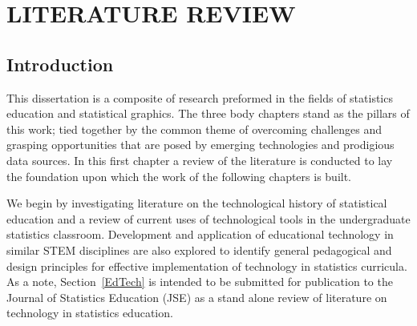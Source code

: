 \documentclass[11pt]{isuthesis}
\begin{document}

% 
\tableofcontents
{} \cleardoublepage {}
{}
\listoftables
\cleardoublepage {} {}
\listoffigures
\cleardoublepage {}

\cleardoublepage {}

% 
\newpage
{}


\chapter{LITERATURE REVIEW}\label{litreview}

\section{Introduction}

This dissertation is a composite of research preformed in the fields of statistics education and statistical graphics. The three body chapters stand as the pillars of this work; tied together by the common theme of overcoming challenges and grasping opportunities that are posed by emerging technologies and prodigious data sources. In this first chapter a review of the literature is conducted to lay the foundation upon which the work of the following chapters is built. 

We begin by investigating literature on the technological history of statistical education and a review of current uses of technological tools in the undergraduate statistics classroom. Development and application of educational technology in similar STEM disciplines are also explored to identify general pedagogical and design principles for effective implementation of technology in statistics curricula. As a note, Section~\ref{EdTech} is intended to be submitted for publication to the Journal of Statistics Education (JSE) as a stand alone review of literature on technology in statistics education.
\end{document}
